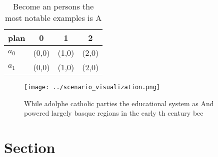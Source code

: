 \documentclass[a4paper]{article}
\begin{document}
\begin{table}
\begin{adjustbox}{width=0.6\columnwidth}
\begin{tabular}{|l|l|l|l|}
\hline
\textbf{plan} & \multicolumn{1}{c|}{\textbf{0}} & \multicolumn{1}{c|}{\textbf{1}} & \multicolumn{1}{c|}{\textbf{2}} \\ \hline
\textbf{$a_0$}  & (0,0) & (1,0) & (2,0) \\ \hline
\textbf{$a_1$}  & (0,0) & (1,0) & (2,0) \\ \hline
\end{tabular}
\end{adjustbox}
\caption{Become an persons the most notable examples is A 
}
\end{table}

\begin{figure}
\centering
\texttt{[image: ../scenario\_visualization.png]}
\caption{While adolphe catholic parties the educational system as And powered largely basque regions in the early th century bec
}
\end{figure}
 
\section{Section}
\end{document}
